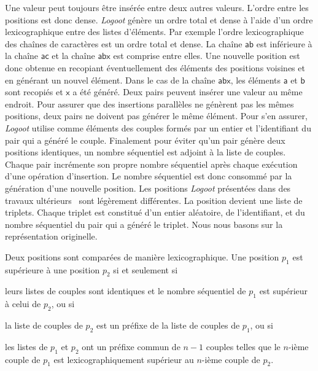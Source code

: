 Une valeur peut toujours être insérée entre deux autres valeurs.
L'ordre entre les positions est donc dense.
\emph{Logoot} génère un ordre total et dense à l'aide d'un ordre lexicographique entre des listes d'éléments.
Par exemple l'ordre lexicographique des chaînes de caractères est un ordre total et dense.
La chaîne $\textsf{ab}$ est inférieure à la chaîne $\textsf{ac}$ et la chaîne $\textsf{abx}$ est comprise entre elles.
Une nouvelle position est donc obtenue en recopiant éventuellement des éléments des positions voisines et en générant un nouvel élément.
Dans le cas de la chaîne $\textsf{abx}$, les éléments $\textsf{a}$ et $\textsf{b}$ sont recopiés et $\textsf{x}$ a été généré.
Deux pairs peuvent insérer une valeur au même endroit.
Pour assurer que des insertions parallèles ne génèrent pas les mêmes positions, deux pairs ne doivent pas générer le même élément.
Pour s'en assurer, \emph{Logoot} utilise comme éléments des couples formés par un entier et l'identifiant du pair qui a généré le couple.
Finalement pour éviter qu'un pair génère deux positions identiques, un nombre séquentiel est adjoint à la liste de couples.
Chaque pair incrémente son propre nombre séquentiel après chaque exécution d'une opération d'insertion.
Le nombre séquentiel est donc consommé par la génération d'une nouvelle position.
Les positions \emph{Logoot} présentées dans des travaux ultérieurs~\autocite{weiss2010logoot} sont légèrement différentes.
La position devient une liste de triplets.
Chaque triplet est constitué d'un entier aléatoire, de l'identifiant, et du nombre séquentiel du pair qui a généré le triplet.
Nous nous basons sur la représentation originelle.

Deux positions sont comparées de manière lexicographique.
Une position $p_1$ est supérieure à une position $p_2$ si et seulement si \begin{inlinelist}\item leurs listes de couples sont identiques et le nombre séquentiel de $p_1$ est supérieur à celui de $p_2$, ou si \item la liste de couples de $p_2$ est un préfixe de la liste de couples de $p_1$, ou si \item les listes de $p_1$ et $p_2$ ont un préfixe commun de $n-1$ couples telles que le $n$-ième couple de $p_1$ est lexicographiquement supérieur au $n$-ième couple de $p_2$.\end{inlinelist}

